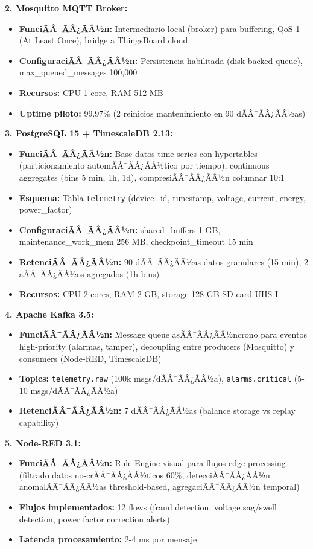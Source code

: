 \textbf{2. Mosquitto MQTT Broker:}
\begin{itemize}
    \item \textbf{FunciÃÂ¯ÃÂ¿ÃÂ½n:} Intermediario local (broker) para buffering, QoS 1 (At Least Once), bridge a ThingsBoard cloud
    \item \textbf{ConfiguraciÃÂ¯ÃÂ¿ÃÂ½n:} Persistencia habilitada (disk-backed queue), max\_queued\_messages 100,000
    \item \textbf{Recursos:} CPU 1 core, RAM 512 MB
    \item \textbf{Uptime piloto:} 99.97\% (2 reinicios mantenimiento en 90 dÃÂ¯ÃÂ¿ÃÂ½as)
\end{itemize}

\textbf{3. PostgreSQL 15 + TimescaleDB 2.13:}
\begin{itemize}
    \item \textbf{FunciÃÂ¯ÃÂ¿ÃÂ½n:} Base datos time-series con hypertables (particionamiento automÃÂ¯ÃÂ¿ÃÂ½tico por tiempo), continuous aggregates (bins 5 min, 1h, 1d), compresiÃÂ¯ÃÂ¿ÃÂ½n columnar 10:1
    \item \textbf{Esquema:} Tabla \texttt{telemetry} (device\_id, timestamp, voltage, current, energy, power\_factor)
    \item \textbf{ConfiguraciÃÂ¯ÃÂ¿ÃÂ½n:} shared\_buffers 1 GB, maintenance\_work\_mem 256 MB, checkpoint\_timeout 15 min
    \item \textbf{RetenciÃÂ¯ÃÂ¿ÃÂ½n:} 90 dÃÂ¯ÃÂ¿ÃÂ½as datos granulares (15 min), 2 aÃÂ¯ÃÂ¿ÃÂ½os agregados (1h bins)
    \item \textbf{Recursos:} CPU 2 cores, RAM 2 GB, storage 128 GB SD card UHS-I
\end{itemize}

\textbf{4. Apache Kafka 3.5:}
\begin{itemize}
    \item \textbf{FunciÃÂ¯ÃÂ¿ÃÂ½n:} Message queue asÃÂ¯ÃÂ¿ÃÂ½ncrono para eventos high-priority (alarmas, tamper), decoupling entre producers (Mosquitto) y consumers (Node-RED, TimescaleDB)
    \item \textbf{Topics:} \texttt{telemetry.raw} (100k msgs/dÃÂ¯ÃÂ¿ÃÂ½a), \texttt{alarms.critical} (5-10 msgs/dÃÂ¯ÃÂ¿ÃÂ½a)
    \item \textbf{RetenciÃÂ¯ÃÂ¿ÃÂ½n:} 7 dÃÂ¯ÃÂ¿ÃÂ½as (balance storage vs replay capability)
\end{itemize}

\textbf{5. Node-RED 3.1:}
\begin{itemize}
    \item \textbf{FunciÃÂ¯ÃÂ¿ÃÂ½n:} Rule Engine visual para flujos edge processing (filtrado datos no-crÃÂ¯ÃÂ¿ÃÂ½ticos 60\%, detecciÃÂ¯ÃÂ¿ÃÂ½n anomalÃÂ¯ÃÂ¿ÃÂ½as threshold-based, agregaciÃÂ¯ÃÂ¿ÃÂ½n temporal)
    \item \textbf{Flujos implementados:} 12 flows (fraud detection, voltage sag/swell detection, power factor correction alerts)
    \item \textbf{Latencia procesamiento:} 2-4 ms por mensaje
\end{itemize}

